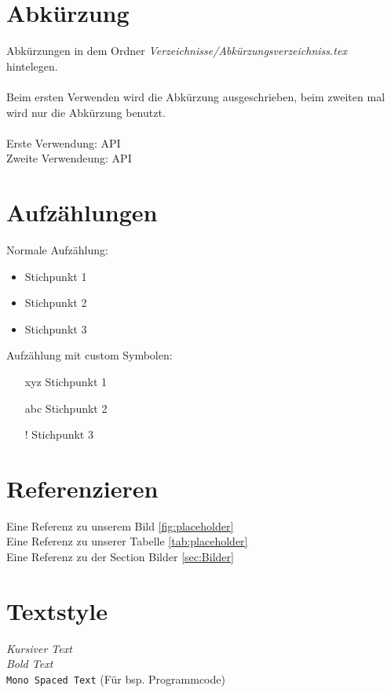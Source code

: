 \section{Abkürzung}
\label{sec:Abkürzung}
%
Abkürzungen in dem Ordner \textit{Verzeichnisse/Abkürzungsverzeichniss.tex} hintelegen.\\\\
%
Beim ersten Verwenden wird die Abkürzung ausgeschrieben, beim zweiten mal wird nur die Abkürzung benutzt.\\\\
%
Erste Verwendung: \ac{API}\\
Zweite Verwendeung: \ac{API}
%
%
\section{Aufzählungen}
\label{sec:Aufzählungen}
%
Normale Aufzählung:
%
\begin{itemize}
    \item Stichpunkt 1
    \item Stichpunkt 2
    \item Stichpunkt 3
\end{itemize}
%
Aufzählung mit custom Symbolen:
%
\begin{itemize}
    \item[xyz] Stichpunkt 1
    \item[abc] Stichpunkt 2
    \item[!] Stichpunkt 3
\end{itemize}
%
%
\section{Referenzieren}
\label{sec:Referenzieren}
%
Eine Referenz zu unserem Bild \ref{fig:placeholder}\\
Eine Referenz zu unserer Tabelle \ref{tab:placeholder}\\
Eine Referenz zu der Section Bilder \ref{sec:Bilder}
%
%
\section{Textstyle}
\label{sec:Textstyle}
%
\textit{Kursiver Text}\\
\textit{Bold Text}\\
\texttt{Mono Spaced Text} (Für bsp. Programmcode)
%
%
